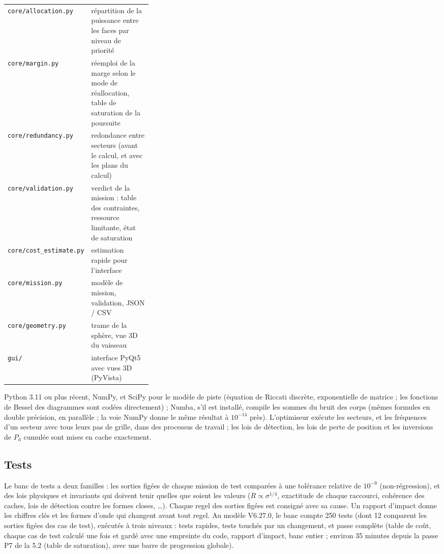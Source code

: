 \documentclass[11pt,a4paper]{article}
\newcommand{\code}[1]{\texttt{\small #1}}
\newcommand{\Pd}{P_{\mathrm d}}
\begin{document}
\begin{center}
\begin{tabularx}{\linewidth}{@{}>{\raggedright\arraybackslash}p{0.33\linewidth}L@{}}
\code{core/allocation.py} & répartition de la puissance entre les faces par niveau de priorité\\
\code{core/margin.py} & réemploi de la marge selon le mode de réallocation, table de saturation de la poursuite\\
\code{core/redundancy.py} & redondance entre secteurs (avant le calcul, et avec les plans du calcul)\\
\code{core/validation.py} & verdict de la mission : table des contraintes, ressource limitante, état de saturation\\
\code{core/cost\_estimate.py} & estimation rapide pour l'interface\\
\code{core/mission.py} & modèle de mission, validation, JSON / CSV\\
\code{core/geometry.py} & trame de la sphère, vue 3D du vaisseau\\
\code{gui/} & interface PyQt5 avec vues 3D (PyVista)\\
\bottomrule
\end{tabularx}
\end{center}
Python 3.11 ou plus récent, NumPy, et SciPy pour le modèle de piste (équation de Riccati discrète, exponentielle de
matrice ; les fonctions de Bessel des diagrammes sont codées directement) ; Numba, s'il est installé, compile les sommes
du bruit des corps (mêmes formules en double précision, en parallèle ; la voie NumPy donne le même résultat à
$10^{-14}$ près). L'optimiseur exécute les secteurs, et les fréquences d'un secteur avec tous leurs pas de grille, dans
des processus de travail ; les lois de détection, les lois de perte de position et les inversions de $\Pd$ cumulée sont
mises en cache exactement.

\subsection{Tests}
Le banc de tests a deux familles : les sorties figées de chaque mission de test comparées à une tolérance relative de
$10^{-9}$ (non-régression), et des lois physiques et invariants qui doivent tenir quelles que soient les valeurs
($R\propto\sigma^{1/4}$, exactitude de chaque raccourci, cohérence des caches, lois de détection contre les formes
closes, \dots). Chaque regel des sorties figées est consigné avec sa cause. Un rapport d'impact donne les chiffres clés
et les formes d'onde qui changent avant tout regel. Au modèle V6.27.0, le banc compte 250 tests (dont 12 comparent les
sorties figées des cas de test), exécutés à trois niveaux : tests rapides, tests touchés par un changement, et passe
complète (table de coût, chaque cas de test calculé une fois et gardé avec une empreinte du code, rapport d'impact, banc
entier ; environ 35 minutes depuis la passe P7 de la 5.2 (table de saturation), avec une barre de progression globale).
\end{document}
